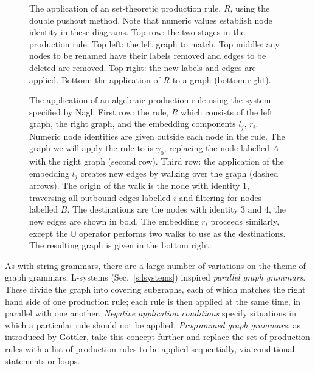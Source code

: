 \begin{figure}
\centering
\def\svgwidth{.8\columnwidth}

\caption[An algebraic production rule]{The application of an set-theoretic production rule, $R$, using the double pushout method\cite{Ehrig73}. Note that numeric values establish node identity in these diagrams. Top row: the two stages in the production rule. Top left: the left graph to match. Top middle: any nodes to be renamed have their labels removed and edges to be deleted are removed. Top right: the new labels and edges are applied. Bottom: the application of $R$ to a graph (bottom right).}
\label{fig:DPO}
\end{figure}

\begin{figure}
\centering
\def\svgwidth{.8\columnwidth}

\caption[An algebraic production rule]{The application of an algebraic production rule using the system specified by Nagl\cite{Nagl76}. First row: the rule, $R$ which consists of the left graph, the right graph, and the embedding components $l_j,\,r_i$. Numeric node identities are given outside each node in the rule. The graph we will apply the rule to is $\gamma_0$, replacing the node labelled $A$ with the right graph (second row). Third row: the application of the embedding $l_j$ creates new edges by walking over the graph (dashed arrows). The origin of the walk is the node with identity $1$, traversing all outbound edges labelled $i$ and filtering for nodes labelled $B$. The destinations are the nodes with identity $3$ and $4$, the new edges are shown in bold. The embedding $r_i$ proceeds similarly, except the $\cup$ operator performs two walks to use as the destinations. The resulting graph is given in the bottom right.}
\label{fig:algebraicGG}
\end{figure}

As with string grammars, there are a large number of variations on the theme of graph grammars. L-systems (Sec.~\ref{s:lsystems}) inspired \emph{parallel graph grammars}\cite{Ehrig76}. These divide the graph into covering subgraphs, each of which matches the right hand side of one production rule; each rule is then applied at the same time, in parallel with one another. \emph{Negative application conditions}\cite{Nagl83,Habel96} specify situations in which a particular rule should not be applied. \emph{Programmed graph grammars}, as introduced by G{\"o}ttler\cite{Gottler88}, take this concept further and replace the set of production rules with a list of production rules to be applied sequentially, via conditional statements or loops. 


